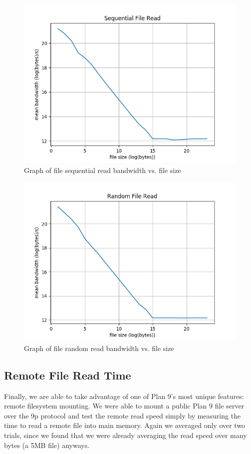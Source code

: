 \documentclass[letterpaper,twocolumn,10pt]{article}
\begin{document}
\begin{figure}
	\centering
	\includegraphics{graphs/file_read_seq}
  \caption{Graph of file sequential read bandwidth vs. file size}
	\label{fig:filecache}
\end{figure}

\begin{figure}
	\centering
	\includegraphics{graphs/file_read_rand}
  \caption{Graph of file random read bandwidth vs. file size}
	\label{fig:filecache}
\end{figure}

\subsection{Remote File Read Time}
Finally, we are able to take advantage of one of Plan 9's most unique features:
remote filesystem mounting. We were able to mount a public Plan 9 file server
over the 9p protocol and test the remote read speed simply by measuring the
time to read a remote file into main memory. Again we averaged only over two
trials, since we found that we were already averaging the read speed over many
bytes (a 5MB file) anyways.
\end{document}
